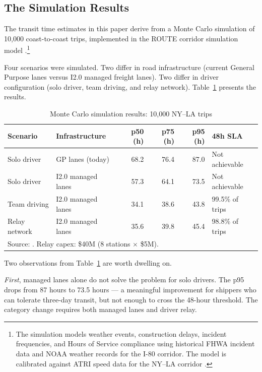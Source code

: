 \subsection{The Simulation Results}

The transit time estimates in this paper derive from a Monte Carlo simulation of 10,000
coast-to-coast trips, implemented in the ROUTE corridor simulation model
\citep{ROUTE_C1}.\footnote{The simulation models weather events, construction delays,
incident frequencies, and Hours of Service compliance using historical FHWA incident data
and NOAA weather records for the I-80 corridor. The model is calibrated against ATRI
speed data for the NY--LA corridor \citep{ATRI_shortage2024}.}

Four scenarios were simulated. Two differ in road infrastructure (current General Purpose
lanes versus I2.0 managed freight lanes). Two differ in driver configuration (solo driver,
team driving, and relay network). Table~\ref{tab:simulation} presents the results.

\begin{table}[h]
\centering
\caption{Monte Carlo simulation results: 10,000 NY--LA trips}
\label{tab:simulation}
\begin{tabular}{llrrrl}
\toprule
Scenario & Infrastructure & p50 (h) & p75 (h) & p95 (h) & 48h SLA \\
\midrule
Solo driver    & GP lanes (today)    & 68.2 & 76.4 & 87.0 & Not achievable \\
Solo driver    & I2.0 managed lanes  & 57.3 & 64.1 & 73.5 & Not achievable \\
Team driving   & I2.0 managed lanes  & 34.1 & 38.6 & 43.8 & 99.5\% of trips \\
Relay network  & I2.0 managed lanes  & 35.6 & 39.8 & 45.4 & 98.8\% of trips \\
\bottomrule
\multicolumn{6}{l}{\footnotesize Source: \citet{ROUTE_C1}. Relay capex: \$40M (8 stations $\times$ \$5M).} \\
\end{tabular}
\end{table}

Two observations from Table~\ref{tab:simulation} are worth dwelling on.

\textit{First}, managed lanes alone do not solve the problem for solo drivers. The p95 drops
from 87 hours to 73.5 hours --- a meaningful improvement for shippers who can tolerate
three-day transit, but not enough to cross the 48-hour threshold. The category change
requires both managed lanes and driver relay.

